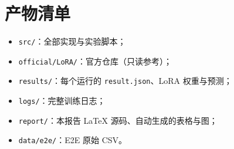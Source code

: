 \documentclass[11pt,a4paper]{ctexart}
\begin{document}
\section{产物清单}
\begin{itemize}
  \item \texttt{src/}：全部实现与实验脚本；
  \item \texttt{official/LoRA/}：官方仓库（只读参考）；
  \item \texttt{results/}：每个运行的 \texttt{result.json}、LoRA 权重与预测；
  \item \texttt{logs/}：完整训练日志；
  \item \texttt{report/}：本报告 LaTeX 源码、自动生成的表格与图；
  \item \texttt{data/e2e/}：E2E 原始 CSV。
\end{itemize}
\end{document}
